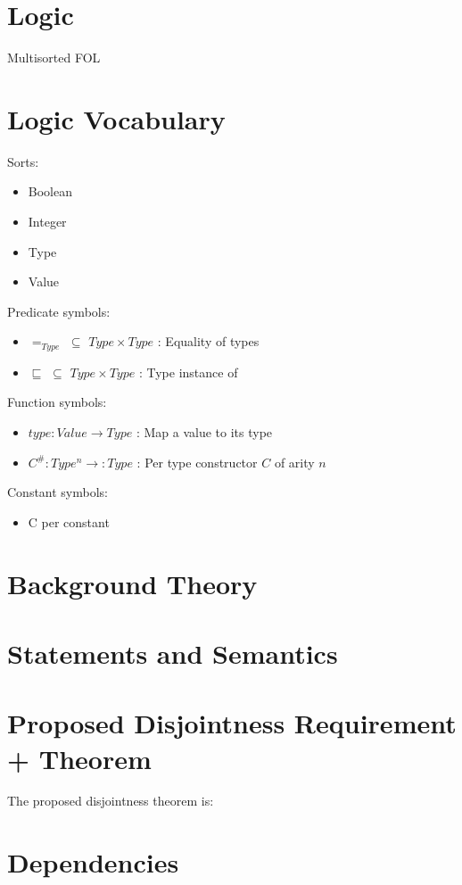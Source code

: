 \documentclass{article}
\begin{document}
\section{Logic}
	Multisorted FOL
	
\section{Logic Vocabulary}
	Sorts:
	\begin{itemize}
		\item Boolean
		\item Integer
		\item Type
		\item Value
	\end{itemize}
	
	Predicate symbols:
	\begin{itemize}
		\item $\equal_{\mathit{Type}} $ $\subseteq$ $Type \times Type $ : Equality of
		types
		\item $\sqsubseteq   $ $\subseteq$ $Type \times Type $ : Type instance of
	\end{itemize}
	
	Function symbols:
	\begin{itemize}
		\item $type : Value  \rightarrow Type $ : Map a value to its type  
		\item $C^\# : Type^n \rightarrow : Type $ : Per type constructor $C$ of
		arity $n$
	\end{itemize}
	
	Constant symbols:
	\begin{itemize}
		\item C per constant
	\end{itemize}

\section{Background Theory}


\section{Statements and Semantics}

\section{Proposed Disjointness Requirement + Theorem}
	The proposed disjointness theorem is:
	

\section{Dependencies}
\end{document}
